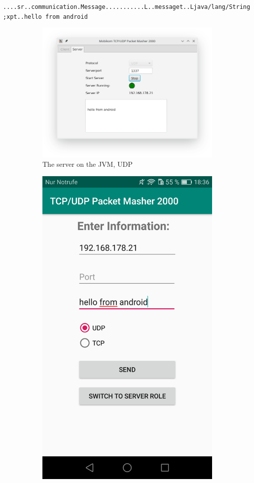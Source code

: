 \texttt{....sr..communication.Message...........L..messaget..Ljava/lang/String;xpt..hello from android}



\begin{figure}[H]
	\centering
	\begin{subfigure}{.49\textwidth}
		\centering
		\includegraphics[width=1\linewidth]{images/task3/subtask2/serverUDPNEW.png}
		\caption{The server on the JVM, UDP}
	\end{subfigure}
	\begin{subfigure}{.49\textwidth}
		\centering
		\includegraphics[width=0.74\linewidth]{images/task3/subtask2/android/clientUDP.png}

\end{subfigure}
\end{figure}
